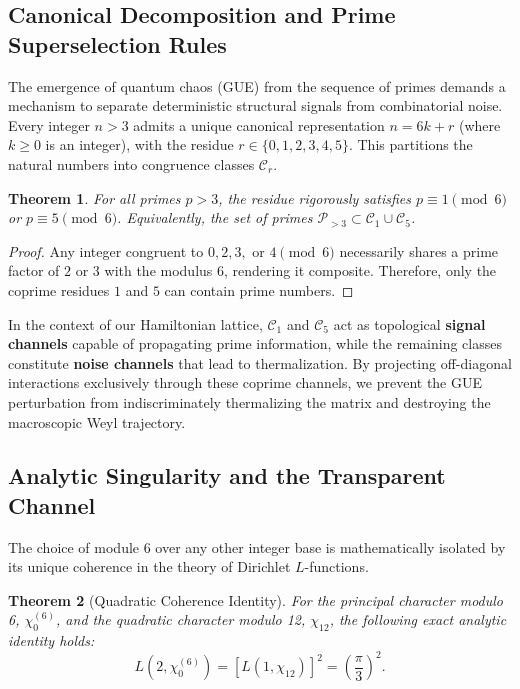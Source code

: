 \documentclass[aps,prl,preprint,superscriptaddress,floatfix]{revtex4-2}
\newtheorem{theorem}{Theorem}[section]
\begin{document}
\subsection{Canonical Decomposition and Prime Superselection Rules}

The emergence of quantum chaos (GUE) from the sequence of primes demands a mechanism to separate deterministic structural signals from combinatorial noise. Every integer $n > 3$ admits a unique canonical representation $n = 6k + r$ (where $k \ge 0$ is an integer), with the residue $r \in \{0,1,2,3,4,5\}$. This partitions the natural numbers into congruence classes $\mathcal{C}_r$. 

\begin{theorem}
For all primes $p > 3$, the residue rigorously satisfies $p \equiv 1 \pmod 6$ or $p \equiv 5 \pmod 6$. Equivalently, the set of primes $\mathcal{P}_{>3} \subset \mathcal{C}_1 \cup \mathcal{C}_5$.
\end{theorem}

\begin{proof}
Any integer congruent to $0, 2, 3,$ or $4 \pmod 6$ necessarily shares a prime factor of $2$ or $3$ with the modulus $6$, rendering it composite. Therefore, only the coprime residues $1$ and $5$ can contain prime numbers.
\end{proof}

In the context of our Hamiltonian lattice, $\mathcal{C}_1$ and $\mathcal{C}_5$ act as topological \textbf{signal channels} capable of propagating prime information, while the remaining classes constitute \textbf{noise channels} that lead to thermalization. By projecting off-diagonal interactions exclusively through these coprime channels, we prevent the GUE perturbation from indiscriminately thermalizing the matrix and destroying the macroscopic Weyl trajectory.

\subsection{Analytic Singularity and the Transparent Channel}

The choice of module 6 over any other integer base is mathematically isolated by its unique coherence in the theory of Dirichlet $L$-functions.

\begin{theorem}[Quadratic Coherence Identity]
\label{thm:quadratic}
For the principal character modulo 6, $\chi_0^{(6)}$, and the quadratic character modulo 12, $\chi_{12}$, the following exact analytic identity holds:
\begin{equation}
L(2, \chi_0^{(6)}) = \left[ L(1, \chi_{12}) \right]^2 = \left( \frac{\pi}{3} \right)^2.
\end{equation}
\end{theorem}
\end{document}
